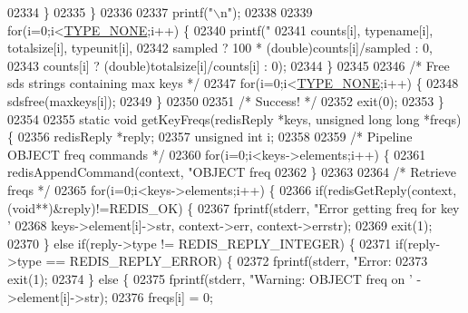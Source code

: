 \begin{DoxyCode}
{{{{{{{{{{{{{{{{{{{{{{{{{{{{{{{{{{{{{{{{{{{{{{{{{{{{{{{{{{{{{{{{{{{{{{{{{{02334         \}
02335     \}
02336 
02337     printf(\textcolor{stringliteral}{"\(\backslash\)n"});
02338 
02339     \textcolor{keywordflow}{for}(i=0;i<\hyperlink{redis-cli_8c_aa47d3c2fa05e95455d76cf052f9cca68}{TYPE\_NONE};i++) \{
02340         printf(\textcolor{stringliteral}{"%
02341            counts[i], \textcolor{keyword}{typename}[i], totalsize[i], typeunit[i],
02342            sampled ? 100 * (\textcolor{keywordtype}{double})counts[i]/sampled : 0,
02343            counts[i] ? (\textcolor{keywordtype}{double})totalsize[i]/counts[i] : 0);
02344     \}
02345 
02346     \textcolor{comment}{/* Free sds strings containing max keys */}
02347     \textcolor{keywordflow}{for}(i=0;i<\hyperlink{redis-cli_8c_aa47d3c2fa05e95455d76cf052f9cca68}{TYPE\_NONE};i++) \{
02348         sdsfree(maxkeys[i]);
02349     \}
02350 
02351     \textcolor{comment}{/* Success! */}
02352     exit(0);
02353 \}
02354 
02355 \textcolor{keyword}{static} \textcolor{keywordtype}{void} getKeyFreqs(redisReply *keys, \textcolor{keywordtype}{unsigned} \textcolor{keywordtype}{long} \textcolor{keywordtype}{long} *freqs) \{
02356     redisReply *reply;
02357     \textcolor{keywordtype}{unsigned} \textcolor{keywordtype}{int} i;
02358 
02359     \textcolor{comment}{/* Pipeline OBJECT freq commands */}
02360     \textcolor{keywordflow}{for}(i=0;i<keys->elements;i++) \{
02361         redisAppendCommand(context, \textcolor{stringliteral}{"OBJECT freq %
02362     \}
02363 
02364     \textcolor{comment}{/* Retrieve freqs */}
02365     \textcolor{keywordflow}{for}(i=0;i<keys->elements;i++) \{
02366         \textcolor{keywordflow}{if}(redisGetReply(context, (\textcolor{keywordtype}{void}**)&reply)!=REDIS\_OK) \{
02367             fprintf(stderr, \textcolor{stringliteral}{"Error getting freq for key '%
02368                 keys->element[i]->str, context->err, context->errstr);
02369             exit(1);
02370         \} \textcolor{keywordflow}{else} \textcolor{keywordflow}{if}(reply->type != REDIS\_REPLY\_INTEGER) \{
02371             \textcolor{keywordflow}{if}(reply->type == REDIS\_REPLY\_ERROR) \{
02372                 fprintf(stderr, \textcolor{stringliteral}{"Error: %
02373                 exit(1);
02374             \} \textcolor{keywordflow}{else} \{
02375                 fprintf(stderr, \textcolor{stringliteral}{"Warning: OBJECT freq on '%
      ->element[i]->str);
02376                 freqs[i] = 0;
}}}}}}}}}}}}}}}}}}}}}}}}}}}}}}}}}}}}}}}}}}}}}}}}}}}}}}}}}}}}}}}}}}}}}}}}}}}}}}}
\end{DoxyCode}

